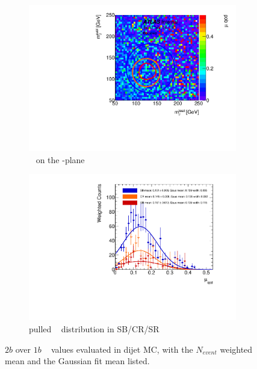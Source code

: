 \begin{figure}[htbp!]
\centering
\captionsetup{justification=centering}
	\hspace{-1cm}
    \begin{subfigure}[b]{0.4\textwidth}
        \includegraphics[width=\textwidth,angle=-90]{figures/boosted/AppendixMuqcdstudy/QCD_TwoTag_Incl_mH0H1.pdf}
        \caption{\muqcd~ on the \mleadJ-\msublJ plane}
        \label{fig:app-muqcd-2b-2d-qcd}
    \end{subfigure}
    \quad \quad \quad \quad 
    \begin{subfigure}[b]{0.4\textwidth}
        \includegraphics[width=\textwidth,angle=-90]{figures/boosted/AppendixMuqcdstudy/QCD_TwoTag_Incl_mH0H1_pull.pdf}
        \caption{pulled \muqcd~ distribution in SB/CR/SR}
        \label{fig:app-muqcd-2b-pull-qcd}
    \end{subfigure}
\caption{$2b$ over $1b$ \muqcd~ values evaluated in dijet MC, with the $N_{event}$ weighted mean and the Gaussian fit mean listed.}
\label{fig:app-muqcd-2b-qcd}
\end{figure}

